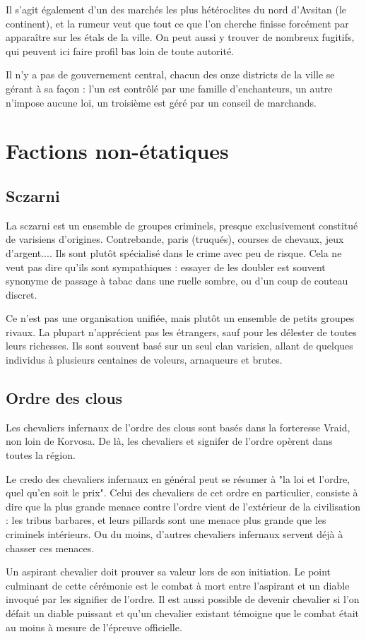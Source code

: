\documentclass[letterpaper,10pt,twoside,twocolumn,openany]{book}
\begin{document}
Il s'agit également d'un des marchés les plus hétéroclites du nord d'Avsitan (le continent), et la rumeur veut que tout ce que l'on cherche finisse forcément par apparaître sur les étals de la ville. On peut aussi y trouver de nombreux fugitifs, qui peuvent ici faire profil bas loin de toute autorité.

Il n'y a pas de gouvernement central, chacun des onze districts de la ville se gérant à sa façon : l'un est contrôlé par une famille d'enchanteurs, un autre n'impose aucune loi, un troisième est géré par un conseil de marchands.
\section{Factions non-étatiques}
\subsection{Sczarni}
La sczarni est un ensemble de groupes criminels, presque exclusivement constitué de varisiens d'origines. Contrebande, paris (truqués), courses de chevaux, jeux d'argent.... Ils sont plutôt spécialisé dans le crime avec peu de risque. Cela ne veut pas dire qu'ils sont sympathiques : essayer de les doubler est souvent synonyme de passage à tabac dans une ruelle sombre, ou d'un coup de couteau discret.

Ce n'est pas une organisation unifiée, mais plutôt un ensemble de petits groupes rivaux. La plupart n'apprécient pas les étrangers, sauf pour les délester de toutes leurs richesses. Ils sont souvent basé sur un seul clan varisien, allant de quelques individus à plusieurs centaines de voleurs, arnaqueurs et brutes.
\subsection{Ordre des clous}
Les chevaliers infernaux de l'ordre des clous sont basés dans la forteresse Vraid, non loin de Korvosa. De là, les chevaliers et signifer de l'ordre opèrent dans toutes la région.

Le credo des chevaliers infernaux en général peut se résumer à "la loi et l'ordre, quel qu'en soit le prix". Celui des chevaliers de cet ordre en particulier, consiste à dire que la plus grande menace contre l'ordre vient de l'extérieur de la civilisation : les tribus barbares, et leurs pillards sont une menace plus grande que les criminels intérieurs. Ou du moins, d'autres chevaliers infernaux servent déjà à chasser ces menaces.

Un aspirant chevalier doit prouver sa valeur lors de son initiation. Le point culminant de cette cérémonie est le combat à mort entre l'aspirant et un diable invoqué par les signifier de l'ordre. Il est aussi possible de devenir chevalier si l'on défait un diable puissant et qu'un chevalier existant témoigne que le combat était au moins à mesure de l'épreuve officielle.
\end{document}
